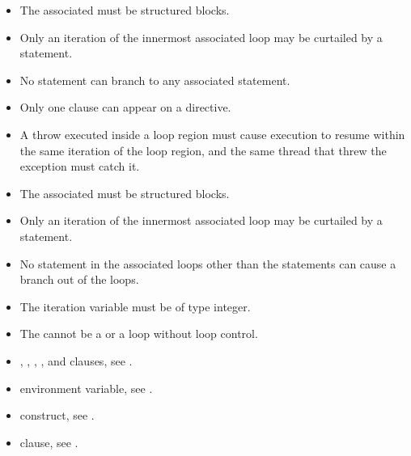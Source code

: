 \ccppspecificstart
\begin{itemize}
\item The associated  must be structured blocks.

\item Only an iteration of the innermost associated loop may be curtailed by a  
statement.

\item No statement can branch to any associated  statement.

\item Only one  clause can appear on a  directive.

\item A throw executed inside a loop region must cause execution to resume within the 
same iteration of the loop region, and the same thread that threw the exception must 
catch it.
\end{itemize}
\ccppspecificend

\fortranspecificstart
\begin{itemize}
\item The associated  must be structured blocks.

\item Only an iteration of the innermost associated loop may be curtailed by a  
statement.

\item No statement in the associated loops other than the  statements can cause a branch 
out of the loops.

\item The  iteration variable must be of type integer.

\item The  cannot be a  or a  loop without loop control.
\end{itemize}
\fortranspecificend

\crossreferences
\begin{itemize}
\item {}, , , , and  clauses, see 
.

\item {} environment variable, see 
.

\item {} construct, see 
.

\item {} clause, see
.
\end{itemize}








